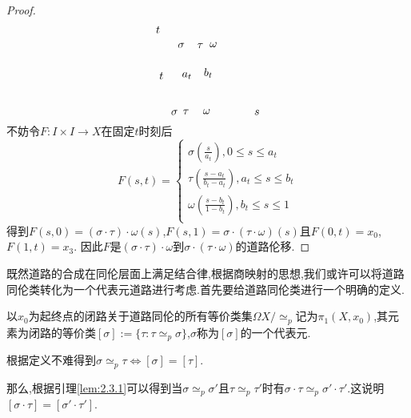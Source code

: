 \documentclass{article}
\begin{document}
\begin{proof}
\[\begin{tikzpicture}[x=0.75pt,y=0.75pt,yscale=-1,xscale=1]
    \draw (104,43.4) node [anchor=north west][inner sep=0.75pt]    {$t$};
    \draw (221.11,143.4) node [anchor=north west][inner sep=0.75pt]    {$s$};
    \draw (122,143.4) node [anchor=north west][inner sep=0.75pt]    {$\sigma $};
    \draw (136.11,142.59) node [anchor=north west][inner sep=0.75pt]    {$\tau $};
    \draw (160,142.4) node [anchor=north west][inner sep=0.75pt]    {$\omega $};
    \draw (168,62.4) node [anchor=north west][inner sep=0.75pt]    {$\omega $};
    \draw (153.11,63.59) node [anchor=north west][inner sep=0.75pt]    {$\tau $};
    \draw (130,63.4) node [anchor=north west][inner sep=0.75pt]    {$\sigma $};
    \draw (108,98.4) node [anchor=north west][inner sep=0.75pt]    {$t$};
    \draw (135,98.4) node [anchor=north west][inner sep=0.75pt]    {$a_{t}$};
    \draw (161,93.4) node [anchor=north west][inner sep=0.75pt]    {$b_{t}$};
    \end{tikzpicture}\]
不妨令$F :I \times I \to X$在固定$t$时刻后
$$
F(s,t) = \left\{
\begin{array}{c}
    \sigma(\frac{s}{a_t}) , 0\leq s \leq a_t\\
    \tau(\frac{s-a_t}{b_t - a_t}), a_t \leq s \leq b_t\\
    \omega(\frac{s-b_t}{1-b_t}),b_t \leq s \leq 1\\
    \end{array}
\right.
$$
得到$F(s,0) = (\sigma\cdot \tau) \cdot \omega(s)$,$F(s,1) = \sigma \cdot(\tau \cdot \omega)(s)$且$F(0,t) = x_0$,$F(1,t) = x_3$.
因此$F$是$(\sigma \cdot \tau) \cdot \omega$到$\sigma \cdot (\tau \cdot \omega)$的道路伦移.
\end{proof}
既然道路的合成在同伦层面上满足结合律,根据商映射的思想,我们或许可以将道路同伦类转化为一个代表元道路进行考虑.首先要给道路同伦类进行一个明确的定义.
\begin{definition}
    以$x_0$为起终点的闭路关于道路同伦的所有等价类集$\Omega X / \simeq_p$记为$\pi_1(X,x_0)$,其元素为闭路的等价类$[\sigma] := \{\tau: \tau \simeq_p \sigma\}$,$\sigma$称为$[\sigma]$的一个代表元.
\end{definition}
根据定义不难得到$\sigma \simeq_p \tau \Leftrightarrow [\sigma] = [\tau]$.


那么,根据引理\ref{lem:2.3.1}可以得到当$\sigma \simeq_p \sigma'$且$\tau \simeq_p \tau'$时有$\sigma \cdot \tau \simeq_p \sigma' \cdot \tau'$.这说明$[\sigma \cdot\tau] = [\sigma' \cdot \tau']$.
\end{document}
